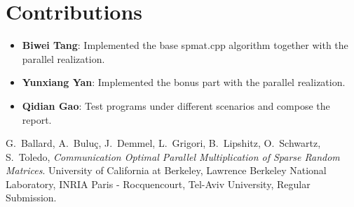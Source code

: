 \documentclass{article}
\begin{document}
\section{Contributions}
\begin{itemize}
    \item \textbf{Biwei Tang}: Implemented the base spmat.cpp algorithm together with the parallel realization.
    \item \textbf{Yunxiang Yan}: Implemented the bonus part with the parallel realization.
    \item \textbf{Qidian Gao}: Test programs under different scenarios and compose the report.
\end{itemize}

\begin{thebibliography}{99}

G.~Ballard, A.~Buluç, J.~Demmel, L.~Grigori, B.~Lipshitz, O.~Schwartz, S.~Toledo,
\textit{Communication Optimal Parallel Multiplication of Sparse Random Matrices}.
University of California at Berkeley, Lawrence Berkeley National Laboratory, INRIA Paris - Rocquencourt, Tel-Aviv University,
Regular Submission.

\end{thebibliography}
\end{document}
